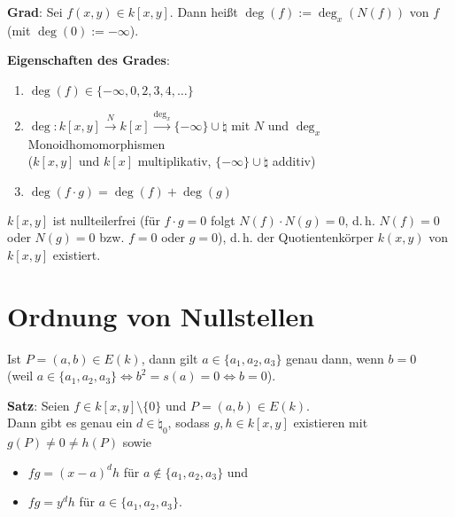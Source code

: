 \linie

\textbf{Grad}:
Sei $f(x, y) \in k[x, y]$.
Dann heißt $\deg(f) := \deg_x(N(f))$  von $f$
(mit $\deg(0) := -\infty$).

\textbf{Eigenschaften des Grades}:
\begin{enumerate}
    \item
    $\deg(f) \in \{-\infty, 0, 2, 3, 4, \dotsc\}$

    \item
    $\deg\colon k[x, y] \xrightarrow{N} k[x] \xrightarrow{\deg_x} \{-\infty\} \cup \natural$
    mit $N$ und $\deg_x$ Monoidhomomorphismen\\
    ($k[x, y]$ und $k[x]$ multiplikativ, $\{-\infty\} \cup \natural$ additiv)

    \item
    $\deg(f \cdot g) = \deg(f) + \deg(g)$
\end{enumerate}

$k[x, y]$ ist nullteilerfrei
(für $f \cdot g = 0$ folgt $N(f) \cdot N(g) = 0$, d.\,h. $N(f) = 0$ oder $N(g) = 0$ bzw.
$f = 0$ oder $g = 0$), d.\,h. der Quotientenkörper $k(x, y)$ von $k[x, y]$ existiert.

\pagebreak

\section{%
    Ordnung von Nullstellen%
}

Ist $P = (a, b) \in E(k)$, dann gilt $a \in \{a_1, a_2, a_3\}$ genau dann, wenn $b = 0$\\
(weil $a \in \{a_1, a_2, a_3\} \iff b^2 = s(a) = 0 \iff b = 0$).

\textbf{Satz}:
Seien $f \in k[x, y] \setminus \{0\}$ und $P = (a, b) \in E(k)$.\\
Dann gibt es genau ein $d \in \natural_0$, sodass $g, h \in k[x, y]$ existieren mit
$g(P) \not= 0 \not= h(P)$ sowie
\begin{itemize}
    \item
    $fg = (x - a)^d h$ für $a \notin \{a_1, a_2, a_3\}$ und

    \item
    $fg = y^d h$ für $a \in \{a_1, a_2, a_3\}$.
\end{itemize}

